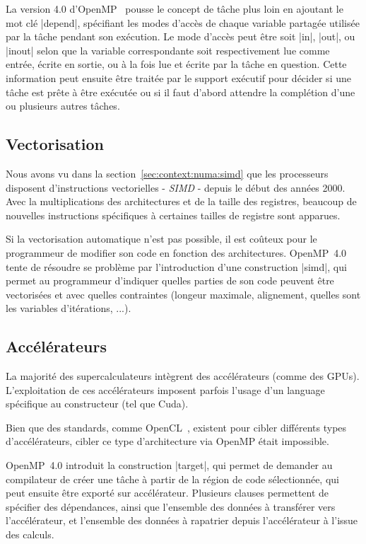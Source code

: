 La version 4.0 d'OpenMP~\cite{openmp40} pousse le concept de tâche plus loin en ajoutant le mot clé |depend|, spécifiant les modes d'accès de chaque variable partagée utilisée par la tâche pendant son exécution.
Le mode d'accès peut être soit |in|, |out|, ou |inout| selon que la variable correspondante soit respectivement lue comme entrée, écrite en sortie, ou à la fois lue et écrite par la tâche en question.
Cette information peut ensuite être traitée par le support exécutif pour décider si une tâche est prête à être exécutée ou si il faut d'abord attendre la complétion d'une ou plusieurs autres tâches.


\subsection{Vectorisation}

Nous avons vu dans la section~\ref{sec:context:numa:simd} que les processeurs disposent d'instructions vectorielles - \emph{SIMD} - depuis le début des années 2000.
Avec la multiplications des architectures et de la taille des registres, beaucoup de nouvelles instructions spécifiques à certaines tailles de registre sont apparues.

Si la vectorisation automatique n'est pas possible, il est coûteux pour le programmeur de modifier son code en fonction des architectures.
OpenMP~4.0 tente de résoudre se problème par l'introduction d'une construction |simd|, qui permet au programmeur d'indiquer quelles parties de son code peuvent être vectorisées et avec quelles contraintes (longeur maximale, alignement, quelles sont les variables d'itérations, ...).


\subsection{Accélérateurs}

La majorité des supercalculateurs intègrent des accélérateurs (comme des GPUs).
L'exploitation de ces accélérateurs imposent parfois l'usage d'un language spécifique au constructeur (tel que Cuda).

Bien que des standards, comme OpenCL~\cite{Stone2010}, existent pour cibler différents types d'accélérateurs, cibler ce type d'architecture via OpenMP était impossible.

OpenMP~4.0 introduit la construction |target|, qui permet de demander au compilateur de créer une tâche à partir de la région de code sélectionnée, qui peut ensuite être exporté sur accélérateur.
Plusieurs clauses permettent de spécifier des dépendances, ainsi que l'ensemble des données à transférer vers l'accélérateur, et l'ensemble des données à rapatrier depuis l'accélérateur à l'issue des calculs.

